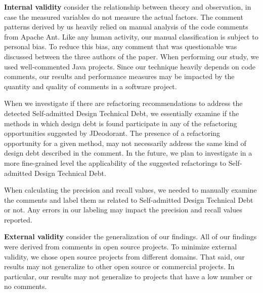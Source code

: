 \documentclass[conference]{IEEEtran}
\newcommand{\SADTD}{Self-admitted Design Technical Debt\xspace}
\begin{document}
\noindent\textbf{Internal validity} consider the relationship between theory and observation, in case the measured variables do not measure the actual factors. The comment patterns derived by us heavily relied on manual analysis of the code comments from Apache Ant. Like any human activity, our manual classification is subject to personal bias. To reduce this bias, any comment that was questionable was discussed between the three authors of the paper. When performing our study, we used well-commented Java projects. Since our technique heavily depends on code comments, our results and performance measures may be impacted by the quantity and quality of comments in a software project.  

When we investigate if there are refactoring recommendations to address the detected \SADTD, we essentially examine if the methods in which design debt is found participate in any of the refactoring opportunities suggested by JDeodorant.
The presence of a refactoring opportunity for a given method, may not necessarily address the same kind of design debt described in the comment. In the future, we plan to investigate in a more fine-grained level the applicability of the suggested refactorings to \SADTD.

When calculating the precision and recall values, we needed to manually examine the comments and label them as related to \SADTD or not. Any errors in our labeling may impact the precision and recall values reported.
 

\noindent \textbf{External validity} consider the generalization of our findings. All of our findings were derived from comments in open source projects. To minimize external validity, we chose open source projects from different domains. That said, our results may not generalize to other open source or commercial projects. In particular, our results may not generalize to projects that have a low number or no comments.
 
\end{document}
